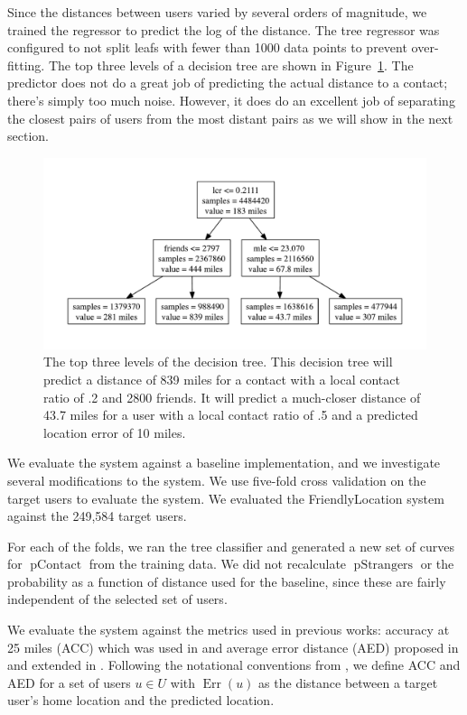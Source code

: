 \documentclass[letterpaper]{article}
\DeclareMathOperator{\pContact}{pContact}
\DeclareMathOperator{\pStrangers}{pStrangers}
\DeclareMathOperator{\Err}{Err}
\begin{document}
Since the distances between users varied by several orders of magnitude, we
trained the regressor to predict the log of the distance.
%
The tree regressor was configured to not split leafs with fewer than 1000 data
points to prevent over-fitting.
%
The top three levels of a decision tree are shown in Figure~\ref{fig:TreeTop}.
%
The predictor does not do a great job of predicting the actual distance to a
contact; there's simply too much noise.
%
However, it does do an excellent job of separating the closest pairs of users
from the most distant pairs as we will show in the next section.

\begin{figure}[tbh]
\centering
\includegraphics[width=\linewidth]{figures/tree_top.pdf}
\caption{
    The top three levels of the decision tree. This decision tree will predict a
    distance of 839 miles for a contact with a local contact ratio of .2 and
    2800 friends. It will predict a much-closer distance of 43.7 miles for a
    user with a local contact ratio of .5 and a predicted location error of 10
    miles.
}
\label{fig:TreeTop}
\end{figure}



We evaluate the system against a baseline implementation, and we investigate
several modifications to the system.
%
We use five-fold cross validation on the target users to evaluate the system.
We evaluated the FriendlyLocation system against the 249,584 target users.

For each of the folds, we ran the tree classifier and generated a new set of
curves for $\pContact$ from the training data.
%
We did not recalculate $\pStrangers$ or the probability as a function of distance
used for the baseline, since these are fairly independent of the selected set
of users.

We evaluate the system against the metrics used in previous works:
accuracy at 25 miles (ACC) which was used in \cite{backstrom2010find}
and average error distance (AED) proposed in \cite{cheng2010you} and
extended in \cite{li2012towards}.
%
Following the notational conventions from \cite{li2012towards}, we define ACC
and AED for a set of users $u \in U$ with $\Err(u)$ as the distance between a
target user's home location and the predicted location.
\end{document}

